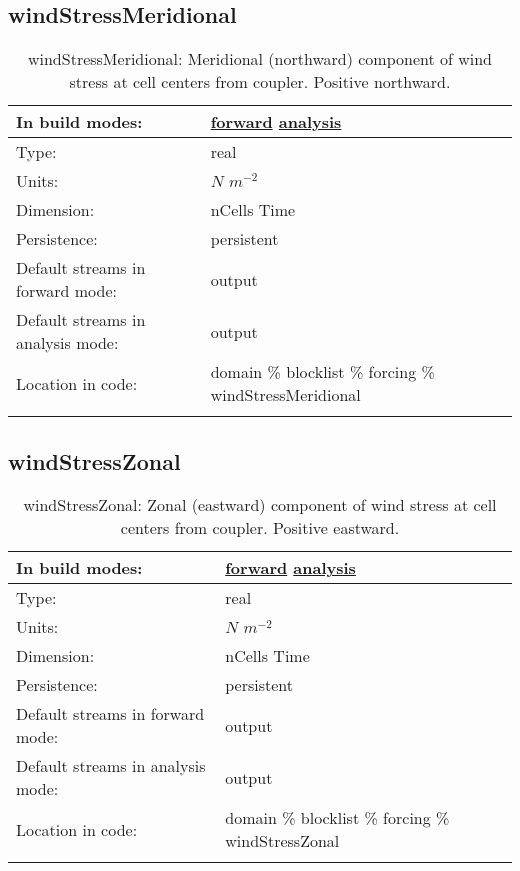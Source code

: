 \subsection[windStressMeridional]{windStressMeridional}
\label{subsec:var_sec_forcing_windStressMeridional}
\begin{center}
\begin{longtable}{| p{2.0in} | p{4.0in} |}
        \hline 
        In build modes: & \hyperref[subsec:forward_var_tab_forcing]{forward} \hyperref[subsec:analysis_var_tab_forcing]{analysis} \\
        \hline 
        Type: & real \\
        \hline 
        Units: & $N$ $m^{-2}$ \\
        \hline 
        Dimension: & nCells Time \\
        \hline 
        Persistence: & persistent \\
        \hline 
		 Default streams in forward mode: &  output \\
        \hline 
		 Default streams in analysis mode: &  output \\
        \hline 
		 Location in code: & domain \% blocklist \% forcing \% windStressMeridional \\
		 \hline 
    \caption{windStressMeridional: Meridional (northward) component of wind stress at cell centers from coupler. Positive northward.}
\end{longtable}
\end{center}
\subsection[windStressZonal]{windStressZonal}
\label{subsec:var_sec_forcing_windStressZonal}
\begin{center}
\begin{longtable}{| p{2.0in} | p{4.0in} |}
        \hline 
        In build modes: & \hyperref[subsec:forward_var_tab_forcing]{forward} \hyperref[subsec:analysis_var_tab_forcing]{analysis} \\
        \hline 
        Type: & real \\
        \hline 
        Units: & $N$ $m^{-2}$ \\
        \hline 
        Dimension: & nCells Time \\
        \hline 
        Persistence: & persistent \\
        \hline 
		 Default streams in forward mode: &  output \\
        \hline 
		 Default streams in analysis mode: &  output \\
        \hline 
		 Location in code: & domain \% blocklist \% forcing \% windStressZonal \\
		 \hline 
    \caption{windStressZonal: Zonal (eastward) component of wind stress at cell centers from coupler. Positive eastward.}
\end{longtable}
\end{center}
